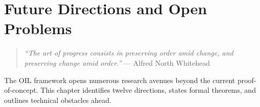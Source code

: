 \chapter{Future Directions and Open Problems}
\label{ch:future_directions}
\begin{quote}
\textit{``The art of progress consists in preserving order amid change, and
preserving change amid order.''} --- Alfred North Whitehead
\end{quote}
The OIL framework opens numerous research avenues beyond the current
proof-of-concept. This chapter identifies twelve directions, states formal
theorems, and outlines technical obstacles ahead.

